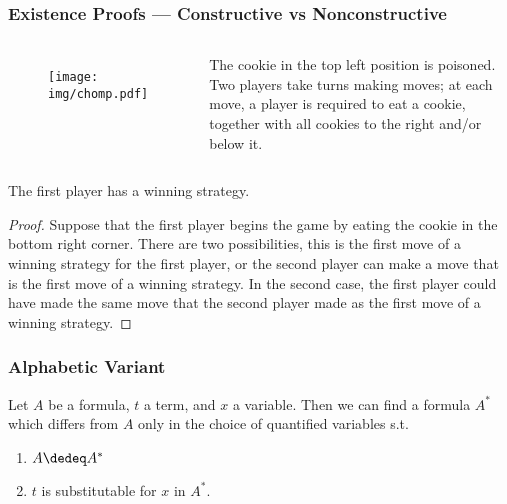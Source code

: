 \documentclass[UTF8,11pt,colorlinks,compress,openany]{beamer}%
\begin{document}
\begin{frame}\frametitle{Existence Proofs --- Constructive vs Nonconstructive}
\begin{columns}
\begin{figure}
	\texttt{[image: img/chomp.pdf]}
\end{figure}
The cookie in the top left position is poisoned. Two players take turns making moves; at each move, a player is required to eat a cookie, together with all cookies to the right and/or below it.
\end{columns}
\begin{theorem}
	The first player has a winning strategy.
\end{theorem}
\begin{proof}
	Suppose that the first player begins the game by eating the cookie in the bottom right corner. There are two possibilities, this is the first move of a winning strategy for the first player, or the second player can make a move that is the first move of a winning strategy. In the second case, the first player could have made the same move that the second player made as the first move of a winning strategy.
\end{proof}
\end{frame}

\begin{frame}\frametitle{Alphabetic Variant}
	\begin{theorem}
		Let $A$ be a formula, $t$ a term, and $x$ a variable. Then we can find a formula $A^*$ which differs from $A$ only in the choice of quantified variables s.t.
		\begin{enumerate}
			\item $A\dedeq A^*$
			\item $t$ is substitutable for $x$ in $A^*$.
		\end{enumerate}
	\end{theorem}
\end{frame}
\end{document}
